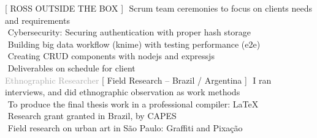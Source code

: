 \begin{cvtable}
%
	{[ R{\scriptsize OSS} O{\scriptsize UTSIDE THE} B{\scriptsize OX} ]}{
        \textperiodcentered $ $ Scrum team ceremonies to focus on clients needs and requirements \\        
        \textperiodcentered $ $ Cybersecurity: Securing authentication with proper hash storage \\
        \textperiodcentered $ $ Building big data workflow (knime) with testing performance (e2e) \\        
        \textperiodcentered $ $ Creating CRUD components with nodejs and expressjs \\
        \textperiodcentered $ $ Deliverables on schedule for client \\
        }  
% 
	{%
	\textcolor{darkgray}{%
    Ethnographic Researcher
	}}
	{
    [ Field Research -- Brazil / Argentina ]%
	}
	{
        \textperiodcentered $ $ I ran interviews, and did ethnographic observation as work methods \\
        \textperiodcentered $ $ To produce the final thesis work in a professional compiler: \LaTeX \\
        \textperiodcentered $ $ Research grant granted in Brazil, by CAPES \\ 
        \textperiodcentered $ $ Field research on urban art in São Paulo: Graffiti and Pixação %
	\wt{%
	}
	}
	
\end{cvtable}
